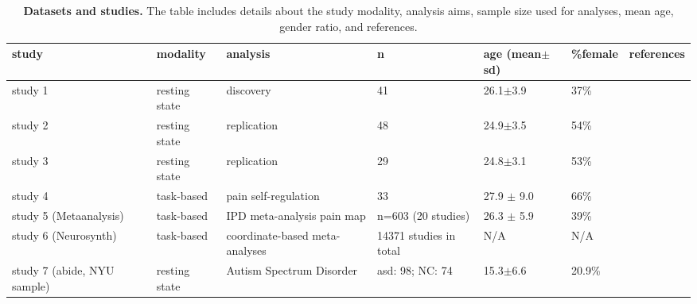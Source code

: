 \documentclass{article}
\begin{document}
\begin{table}
\centering
\caption[]{\textbf{Datasets and studies.} The table includes details about the study modality, analysis aims, sample size used for analyses, mean age, gender ratio, and references.}
\label{tab-samples}
\begin{tabular}{p{}p{}p{}p{}p{}p{}p{}}
\toprule
study & modality & analysis & n & age (mean$\pm$sd) & \%female & references \\
\hline
study 1 & resting state & discovery & 41 & 26.1$\pm$3.9 & 37\% & \cite{Spisak_2020} \\
study 2 & resting state & replication & 48 & 24.9$\pm$3.5 & 54\% & \cite{Spisak_2020} \\
study 3 & resting state & replication & 29 & 24.8$\pm$3.1 & 53\% & \cite{Spisak_2020} \\
study 4 & task-based & pain self-regulation & 33 & 27.9 $\pm$ 9.0 & 66\% & \cite{Woo_2015} \\
study 5 (Metaanalysis) & task-based & IPD meta-analysis pain map & n=603 (20 studies) & 26.3 $\pm$ 5.9 & 39\% & \cite{zunhammer2021meta} \\
study 6 (Neurosynth) & task-based & coordinate-based meta-analyses & 14371 studies in total & N/A & N/A & \cite{Yarkoni_2011} \\
study 7 (\acrshort{abide}, NYU sample) & resting state & Autism Spectrum Disorder & \acrshort{asd}: 98; NC: 74 & 15.3$\pm$6.6 & 20.9\% & \cite{di2014autism} \\
\bottomrule
\end{tabular}
\end{table}
\end{document}
